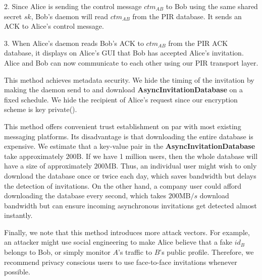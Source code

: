2. Since Alice is sending the control message $ctm_{AB}$ to Bob using the same shared secret $sk$, Bob's daemon will read $ctm_{AB}$ from the PIR database. It sends an ACK to Alice's control message.

3. When Alice's daemon reads Bob's ACK to $ctm_{AB}$ from the PIR ACK database, it displays on Alice's GUI that Bob has accepted Alice's invitation. Alice and Bob can now communicate to each other using our PIR transport layer.

This method achieves metadata security. We hide the timing of the invitation by making the daemon send to and download \textbf{AsyncInvitationDatabase} on a fixed schedule. We hide the recipient of Alice's request since our encryption scheme is key private(). 

This method offers convenient trust establishment on par with most existing messaging platforms. Its disadvantage is that downloading the entire database is expensive. We estimate that a key-value pair in the \textbf{AsyncInvitationDatabase} take approximately $200\text{B}$. If we have 1 million users, then the whole database will have a size of approximately $200\text{MB}$. Thus, an individual user might wish to only download the database once or twice each day, which saves bandwidth but delays the detection of invitations. On the other hand, a company user could afford downloading the database every second, which takes $200\text{MB}/s$ download bandwidth but can ensure incoming asynchronous invitations get detected almost instantly.

Finally, we note that this method introduces more attack vectors. For example, an attacker might use social engineering to make Alice believe that a fake $id_B$ belongs to Bob, or simply monitor $A$'s traffic to $B$'s public profile. Therefore, we recommend privacy conscious users to use face-to-face invitations whenever possible.

\